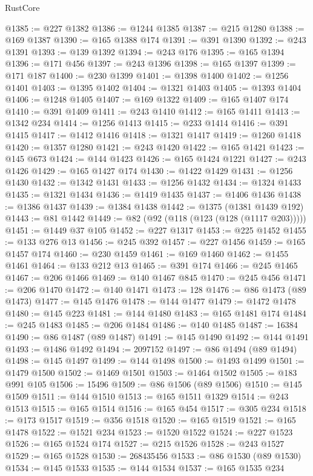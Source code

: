 \begin{lexlean}{RustCore}
\begin{coremodule}
@1385 := @227 @1382
@1386 := @1244 @1385
@1387 := @215 @1280
@1388 := @169 @1387
@1390 := @165 @1388 @174
@1391 := @391 @1390
@1392 := @243 @1391
@1393 := @139 @1392
@1394 := @243 @176
@1395 := @165 @1394
@1396 := @171 @456
@1397 := @243 @1396
@1398 := @165 @1397
@1399 := @171 @187
@1400 := @230 @1399
@1401 := @1398 @1400
@1402 := @1256 @1401
@1403 := @1395 @1402
@1404 := @1321 @1403
@1405 := @1393 @1404
@1406 := @1248 @1405
@1407 := @169 @1322
@1409 := @165 @1407 @174
@1410 := @391 @1409
@1411 := @243 @1410
@1412 := @165 @1411
@1413 := @1342 @234
@1414 := @1256 @1413
@1415 := @233 @1414
@1416 := @391 @1415
@1417 := @1412 @1416
@1418 := @1321 @1417
@1419 := @1260 @1418
@1420 := @1357 @1280
@1421 := @243 @1420
@1422 := @165 @1421
@1423 := @145 @673
@1424 := @144 @1423
@1426 := @165 @1424 @1221
@1427 := @243 @1426
@1429 := @165 @1427 @174
@1430 := @1422 @1429
@1431 := @1256 @1430
@1432 := @1342 @1431
@1433 := @1256 @1432
@1434 := @1324 @1433
@1435 := @1321 @1434
@1436 := @1419 @1435
@1437 := @1406 @1436
@1438 := @1386 @1437
@1439 := @1384 @1438
@1442 := @1375 (@1381 @1439 @192)
@1443 := @81 @1442
@1449 := @82 (@92 (@118 (@123 (@128 (@1117 @203)))))
@1451 := @1449 @37 @105
@1452 := @227 @1317
@1453 := @225 @1452
@1455 := @133 @276 @13
@1456 := @245 @392
@1457 := @227 @1456
@1459 := @165 @1457 @174
@1460 := @230 @1459
@1461 := @169 @1460
@1462 := @1455 @1461
@1464 := @133 @212 @13
@1465 := @391 @174
@1466 := @245 @1465
@1467 := @206 @1466
@1469 := @140 @1467 @845
@1470 := @245 @456
@1471 := @206 @1470
@1472 := @140 @1471
@1473 := 128
@1476 := @86 @1473 (@89 @1473)
@1477 := @145 @1476
@1478 := @144 @1477
@1479 := @1472 @1478
@1480 := @145 @223
@1481 := @144 @1480
@1483 := @165 @1481 @174
@1484 := @245 @1483
@1485 := @206 @1484
@1486 := @140 @1485
@1487 := 16384
@1490 := @86 @1487 (@89 @1487)
@1491 := @145 @1490
@1492 := @144 @1491
@1493 := @1486 @1492
@1494 := 2097152
@1497 := @86 @1494 (@89 @1494)
@1498 := @145 @1497
@1499 := @144 @1498
@1500 := @1493 @1499
@1501 := @1479 @1500
@1502 := @1469 @1501
@1503 := @1464 @1502
@1505 := @183 @991 @105
@1506 := 15496
@1509 := @86 @1506 (@89 @1506)
@1510 := @145 @1509
@1511 := @144 @1510
@1513 := @165 @1511 @1329
@1514 := @243 @1513
@1515 := @165 @1514
@1516 := @165 @454
@1517 := @305 @234
@1518 := @173 @1517
@1519 := @356 @1518
@1520 := @165 @1519
@1521 := @165 @1478
@1522 := @1521 @234
@1523 := @1520 @1522
@1524 := @227 @1523
@1526 := @165 @1524 @174
@1527 := @215 @1526
@1528 := @243 @1527
@1529 := @165 @1528
@1530 := 268435456
@1533 := @86 @1530 (@89 @1530)
@1534 := @145 @1533
@1535 := @144 @1534
@1537 := @165 @1535 @234

\end{coremodule}
\end{lexlean}
